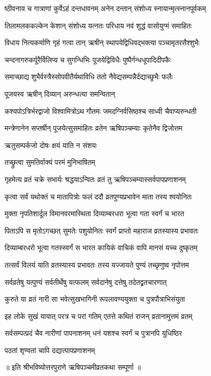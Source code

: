 \twolineshloka
{ष्ठीवनाय च गात्राणां कुर्वेऽहं दन्तधावनम्}
{अनेन दन्तान् संशोध्य स्नायान्मृत्स्नानपूर्वकम्} %

\twolineshloka
{तिलामलककल्केन केशान् संशोध्य यत्नतः}
{परिधाय नवं शुद्धं वासोयुग्मं समाहितः} %

\twolineshloka
{विधाय नित्यकर्माणि गृहं गत्वा तान् ऋषीन्}
{स्थापयेद्विधिवद्भक्त्या पञ्चामृतरसैश्शुभैः} %

\twolineshloka
{चन्दनागरुकर्पूरैर्विलिप्य च सुगन्धिभिः}
{पूजयेद्विविधैः पुष्पैर्गन्धधूपादिदीपकैः} %

\twolineshloka
{समाच्छाद्य शुभैर्वस्त्रैस्सोपवीतैर्यथाविधि}
{ततो नैवेद्यसम्पन्नैर्दद्याच्छुभैः फलैः} %

\onelineshloka
{पूजयस्व ऋषीन् दिव्यान् अरुन्धत्या समन्वितान्} %

\twolineshloka
{कश्यपोऽत्रिर्भरद्वाजो विश्वामित्रोऽथ गौतमः}
{जमदग्निर्वसिष्ठश्च साध्वी चैवाप्यरुन्धती} %

\twolineshloka
{मन्त्रेणानेन सप्तर्षीन् पूजयेत्सुसमाहितः}
{व्रतेन ऋषिपञ्चम्याः कृतेनैव द्विजोत्तम} %

\onelineshloka
{ऋतुसम्पर्कजो दोषः क्षयं याति न संशयः} %


\onelineshloka
{तच्छ्रुत्वा सुमतिर्वाक्यं परमं मुनिभाषितम्} %

\twolineshloka
{गृहमेत्य व्रतं चक्रे सभार्यः श्रद्धयाऽन्वितः}
{व्रतं तु ऋषिपञ्चम्यास्सर्वपापप्रणाशनम्} %

\twolineshloka
{कृत्वा सर्वं यथोक्तं च मातापित्रोः फलं ददौ}
{व्रतपुण्यप्रभावेन माता तस्य श्वयोनितः} %

\twolineshloka
{मुक्ता नृपतिशार्दूल विमानवरमास्थिता}
{दिव्याम्बरधरा भूत्वा गता स्वर्गं च भारत} %

\twolineshloka
{पिताऽपि स मृतोऽगच्छत् सुमतेः पशुयोनितः}
{स्वर्गं प्राप्तो महाराज व्रतस्यास्य प्रभावतः} %

\twolineshloka
{दिव्याम्बरधरो भूत्वा गतस्स्वर्गं स भारत}
{कायिकं वाचिकं वापि मानसं यच्च दुष्कृतम्} %

\twolineshloka
{तत्सर्वं विलयं याति व्रतस्यास्य प्रभावतः}
{तस्य यज्जायते पुण्यं तच्छृणुष्व नृपोत्तम} %

\twolineshloka
{सर्वव्रतेषु यत्पुण्यं सर्वतीर्थेषु यत्फलम्}
{सर्वदानेषु दत्तेषु तदेतद्व्रतचारणात्} %

\twolineshloka
{कुरुते या व्रतं नारी सा भवेत्सुखभागिनी}
{रूपलावण्ययुक्ता च पुत्रपौत्राभिसंयुता} %

\twolineshloka
{इह लोके सुखं यायात् परत्र च परां गतिम्}
{एतत्ते कथितं राजन् व्रतानामुत्तमं व्रतम्} %

\twolineshloka
{सर्वसम्पत्प्रदं चैव नारीणां पापनाशनम्}
{धनं यशश्च स्वर्गं च पुत्रानपि युधिष्ठिर} %

\onelineshloka
{पठतां शृण्वतां चापि दद्यात्पापप्रणाशनम्} %

॥ इति श्रीभविष्योत्तरपुराणे ऋषिपञ्चमीव्रतकथा सम्पूर्णा ॥
